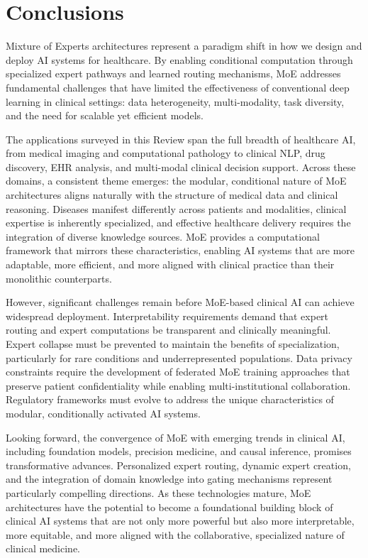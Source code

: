 
\section*{Conclusions}

Mixture of Experts architectures represent a paradigm shift in how we design and deploy AI systems for healthcare. By enabling conditional computation through specialized expert pathways and learned routing mechanisms, MoE addresses fundamental challenges that have limited the effectiveness of conventional deep learning in clinical settings: data heterogeneity, multi-modality, task diversity, and the need for scalable yet efficient models.

The applications surveyed in this Review span the full breadth of healthcare AI, from medical imaging and computational pathology to clinical NLP, drug discovery, EHR analysis, and multi-modal clinical decision support. Across these domains, a consistent theme emerges: the modular, conditional nature of MoE architectures aligns naturally with the structure of medical data and clinical reasoning. Diseases manifest differently across patients and modalities, clinical expertise is inherently specialized, and effective healthcare delivery requires the integration of diverse knowledge sources. MoE provides a computational framework that mirrors these characteristics, enabling AI systems that are more adaptable, more efficient, and more aligned with clinical practice than their monolithic counterparts.

However, significant challenges remain before MoE-based clinical AI can achieve widespread deployment. Interpretability requirements demand that expert routing and expert computations be transparent and clinically meaningful. Expert collapse must be prevented to maintain the benefits of specialization, particularly for rare conditions and underrepresented populations. Data privacy constraints require the development of federated MoE training approaches that preserve patient confidentiality while enabling multi-institutional collaboration. Regulatory frameworks must evolve to address the unique characteristics of modular, conditionally activated AI systems.

Looking forward, the convergence of MoE with emerging trends in clinical AI, including foundation models, precision medicine, and causal inference, promises transformative advances. Personalized expert routing, dynamic expert creation, and the integration of domain knowledge into gating mechanisms represent particularly compelling directions. As these technologies mature, MoE architectures have the potential to become a foundational building block of clinical AI systems that are not only more powerful but also more interpretable, more equitable, and more aligned with the collaborative, specialized nature of clinical medicine.

